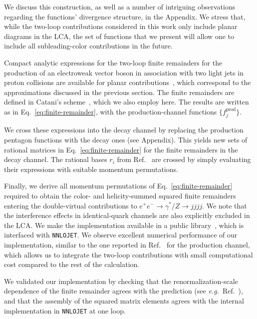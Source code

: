 \documentclass[10pt,aps,prl,superscriptaddress,twocolumn,preprintnumbers,nofootinbib]{revtex4-2}
\begin{document}
We discuss this construction, as well as a number of intriguing observations regarding the functions' divergence structure, in the Appendix.
We stress that, while the two-loop contributions considered in this work only include planar diagrams in the LCA, the set of functions that we present will allow one to include all subleading-color contributions in the future.


Compact analytic expressions for the two-loop finite remainders for the production of an electroweak vector boson in association with two light jets in proton collisions are available for planar contributions~\cite{Abreu:2021asb,DeLaurentis:2025dxw}, which correspond to the approximations discussed in the previous section. The finite remainders are defined in Catani's scheme~\cite{Catani:1998bh,Sterman:2002qn,Becher:2009cu}, which we also employ here.
The results are written as in Eq.~\eqref{eq:finite-remainder},
with the production-channel functions $\{f_j^{\text{prod}}\}$.

We cross these expressions into the decay channel by replacing the  production pentagon functions with the decay ones (see Appendix). This yields new sets of rational matrices in Eq.~\eqref{eq:finite-remainder} for the finite remainders in the decay channel.
The rational bases $r_i$ from Ref.~\cite{DeLaurentis:2025dxw} are crossed by simply evaluating their expressions with suitable momentum permutations.


Finally, we derive all momentum permutations of Eq.~\eqref{eq:finite-remainder} required to obtain the color- and helicity-summed squared finite remainders entering the double-virtual contributions to $e^+ e^- \to \gamma^*/Z \to jjjj$.
We note that the interference effects in identical-quark channels are also explicitly excluded in the LCA.
We make the implementation available in a public library~\cite{FivePointAmplitudes}, which is interfaced with \texttt{NNLOJET}.
We observe excellent numerical performance of our implementation, similar to the one reported in Ref.~\cite{DeLaurentis:2025dxw} for the production channel,
which allows us to integrate the two-loop contributions with small computational cost compared to the rest of the calculation.

We validated our implementation by  checking that the renormalization-scale dependence of the finite remainder agrees with the prediction (see \textit{e.g.}\ Ref.~\cite{Abreu:2021oya}),
and that the assembly of the squared matrix elements agrees with the internal implementation in \texttt{NNLOJET} at one loop.
\end{document}
